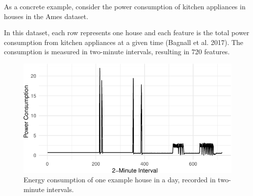 As a concrete example, consider the power consumption of kitchen
appliances in houses in the Ames dataset.

\begin{Shaded}
\begin{Highlighting}[]
\OtherTok{=}\SpecialCharTok{::}
\end{Highlighting}
\end{Shaded}

In this dataset, each row represents one house and each feature is the
total power consumption from kitchen appliances at a given time (Bagnall
et al. 2017). The consumption is measured in two-minute intervals,
resulting in 720 features.

\begin{Shaded}
\begin{Highlighting}[]
\NormalTok{(}\NormalTok{(} \NormalTok{(energy\_data[}\NormalTok{, ])),}
    \NormalTok{(} \SpecialCharTok{:}\NormalTok{)) }\SpecialCharTok{+}
  \NormalTok{() }\SpecialCharTok{+} \NormalTok{() }\SpecialCharTok{+}
  \NormalTok{(} \NormalTok{, } \NormalTok{)}
\end{Highlighting}
\end{Shaded}

\begin{figure}[H]

{\centering \includegraphics[width=1\textwidth,height=\textheight]{chapters/chapter9/preprocessing_files/figure-pdf/fig-energy-1.pdf}

}

\caption{\label{fig-energy}Energy consumption of one example house in a
day, recorded in two-minute intervals.}

\end{figure}

